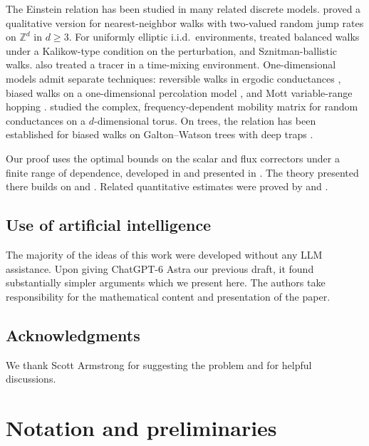 \documentclass[11pt]{amsart}
\theoremstyle{definition}
\theoremstyle{remark}
\numberwithin{equation}{section}
\newcommand{\Zd}{\mathbb Z^d}
\begin{document}
The Einstein relation has been studied in many related discrete models. \citet{KomorowskiOllaRWRE2005} proved a qualitative version for nearest-neighbor walks with two-valued random jump rates on $\Zd$ in $d\geq3$. For uniformly elliptic i.i.d.\ environments, \citet{Guo2016} treated balanced walks under a Kalikow-type condition on the perturbation, and Sznitman-ballistic walks. \citet{KomorowskiOlla2005} also treated a tracer in a time-mixing environment. One-dimensional models admit separate techniques: reversible walks in ergodic conductances \citep{LamDepauw2016,FaggionatoSalvi2019}, biased walks on a one-dimensional percolation model \citep*{GantertMeinersMueller2019}, and Mott variable-range hopping \citep*{FaggionatoGantertSalvi2019}. \citet{FaggionatoSalvi2025} studied the complex, frequency-dependent mobility matrix for random conductances on a $d$-dimensional torus. On trees, the relation has been established for biased walks on Galton--Watson trees with deep traps \citep*{BenArousHuOllaZeitouni2013}.

Our proof uses the optimal bounds on the scalar and flux correctors under a finite range of dependence, developed in \citet*{armstrong2017additive} and presented in \citet*{AKM2019book}. The theory presented there builds on \citet{ArmstrongSmart2016} and \citet*{armstrong2016mesoscopic}. Related quantitative estimates were proved by \citet{GloriaOtto2011,GloriaOtto2016corrector} and \citet*{gloria2020regularity}.

\subsection*{Use of artificial intelligence}
The majority of the ideas of this work were developed without any LLM assistance. Upon giving ChatGPT-6 Astra 
our previous draft, it found substantially simpler arguments which we present here.  The authors take responsibility for the mathematical content and presentation of the paper.

\subsection*{Acknowledgments}
We thank Scott Armstrong for suggesting the problem and for helpful discussions.

\section{Notation and preliminaries}\label{sec.notation}
\end{document}
